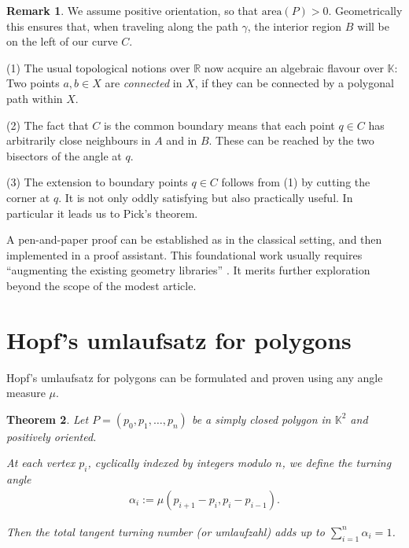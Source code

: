 \documentclass[a4paper]{amsart}
\numberwithin{equation}{section}
\theoremstyle{plain}
\newtheorem{theorem}{Theorem}[section]
\theoremstyle{definition}
\newtheorem{remark}[theorem]{Remark}
\newcommand{\R}{\mathbb{R}}
\newcommand{\K}{\mathbb{K}}
\newcommand{\ee}[2]{\mathopen] #1, #2 \mathclose[}
\newcommand{\area}{\mathrm{area}}
\begin{document}
\begin{remark}
  We assume positive orientation, so that $\area(P) > 0$.
  Geometrically this ensures that, when traveling along the path $\gamma$,
  the interior region $B$ will be on the left of our curve $C$.
  
  (1) The usual topological notions over $\R$
  now acquire an algebraic flavour over $\K$:
  Two points $a,b \in X$ are \emph{connected} in $X$,
  if they can be connected by a polygonal path within $X$.
  
  (2) The fact that $C$ is the common boundary means that
  each point $q \in C$ has arbitrarily close neighbours in $A$ and in $B$.
  These can be reached by the two bisectors of the angle at $q$.

  (3) The extension to boundary points $q \in C$ %
  follows from (1) by cutting the corner at $q$. %
  It is not only oddly satisfying but also practically useful.
  In particular it leads us to Pick's theorem. %
\end{remark}

A pen-and-paper proof %
can be established as in the classical setting,
and then implemented in a proof assistant. %
This foundational work usually requires
“augmenting the existing geometry libraries” \cite{Binder:Kosaian:2024}.
It merits further exploration beyond the scope of the modest article.


\setcounter{section}{7}
\section{Hopf's umlaufsatz for polygons}

Hopf's umlaufsatz for polygons can be formulated
and proven using any angle measure $\mu$.

\begin{theorem}
  Let $P = (p_0,p_1,\ldots,p_n)$ be a simply closed
  polygon in $\K^2$ and positively oriented.
  
  At each vertex $p_i$, cyclically indexed
  by integers modulo $n$, we define the turning angle
  \begin{align*}
    \alpha_i := \mu(p_{i+1}-p_i, p_i-p_{i-1}) .
  \end{align*}

  Then the total tangent turning number (or umlaufzahl)
  adds up to $\sum_{i=1}^n \alpha_i = 1$.
\end{theorem}
\end{document}
